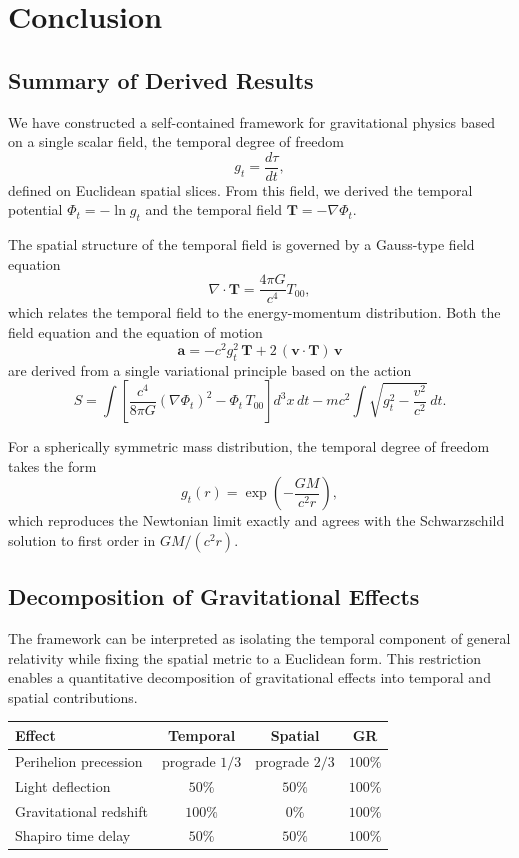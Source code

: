 \documentclass[12pt]{article}
\begin{document}
\section{Conclusion}
\label{sec:conclusion}

\subsection{Summary of Derived Results}
\label{sec:summary}

We have constructed a self-contained framework for gravitational physics based on a single scalar field, the temporal degree of freedom
$$
g_t = \frac{d\tau}{dt},
$$
defined on Euclidean spatial slices. From this field, we derived the temporal potential $\Phi_t = -\ln g_t$ and the temporal field
$\mathbf{T} = -\nabla \Phi_t$.

The spatial structure of the temporal field is governed by a Gauss-type field equation
$$
\nabla \cdot \mathbf{T} = \frac{4\pi G}{c^4} T_{00},
$$
which relates the temporal field to the energy-momentum distribution. Both the field equation and the equation of motion
$$
\mathbf{a} = -c^2 g_t^2\,\mathbf{T}
  + 2\,(\mathbf{v}\cdot\mathbf{T})\,\mathbf{v}
$$
are derived from a single variational principle based on the action
$$
S = \int \left[ \frac{c^4}{8\pi G} (\nabla \Phi_t)^2
  - \Phi_t \, T_{00} \right] d^3x\, dt
- m c^2 \int \sqrt{g_t^2 - \frac{v^2}{c^2}} \, dt.
$$

For a spherically symmetric mass distribution, the temporal degree of freedom takes the form
$$
g_t(r) = \exp\left(-\frac{GM}{c^2 r}\right),
$$
which reproduces the Newtonian limit exactly and agrees with the Schwarzschild solution to first order in $GM/(c^2 r)$.

\subsection{Decomposition of Gravitational Effects}
\label{sec:decomposition}

The framework can be interpreted as isolating the temporal component of general relativity while fixing the spatial metric to a Euclidean form. This restriction enables a quantitative decomposition of gravitational effects into temporal and spatial contributions.

\begin{center}
\small
\begin{tabular}{lccc}
\hline
Effect & Temporal & Spatial & GR \\
\hline
Perihelion precession & prograde $1/3$ & prograde $2/3$ & $100\%$ \\
Light deflection & $50\%$ & $50\%$ & $100\%$ \\
Gravitational redshift & $100\%$ & $0\%$ & $100\%$ \\
Shapiro time delay & $50\%$ & $50\%$ & $100\%$ \\
\hline
\end{tabular}
\end{center}
\end{document}
